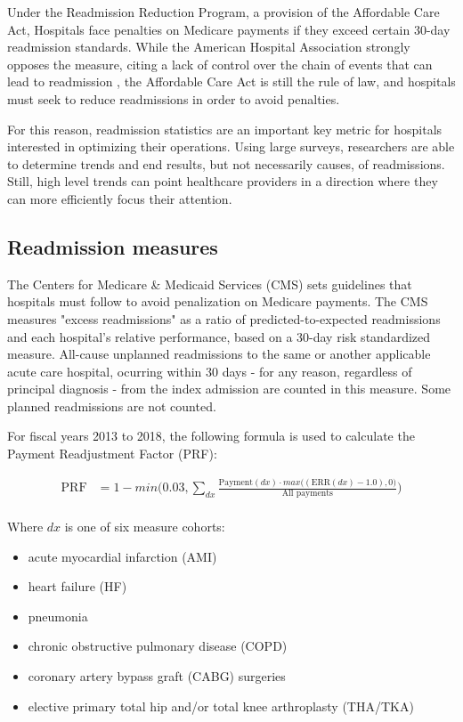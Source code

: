 Under the Readmission Reduction Program, a provision of the Affordable Care Act, 
Hospitals face penalties on Medicare payments if they exceed certain 30-day readmission standards. While the 
American Hospital Association strongly opposes the measure, citing a lack of control over the chain of events
that can lead to readmission \cite{Rice2015, AHA2018}, the Affordable Care Act is still the rule of law, and hospitals must seek
to reduce readmissions in order to avoid penalties.

For this reason, readmission statistics are an important key metric for hospitals interested in optimizing 
their operations. Using large surveys, researchers are able to determine trends and end results, but not necessarily 
causes, of readmissions. Still, high level trends can point healthcare providers in a direction where they can
more efficiently focus their attention. 

\subsection{Readmission measures}

The Centers for Medicare \& Medicaid Services (CMS) sets guidelines that hospitals must follow to avoid penalization on Medicare payments. 
The CMS measures "excess readmissions" as a ratio of predicted-to-expected readmissions and each hospital's relative performance, based on
a 30-day risk standardized measure. All-cause unplanned readmissions to the same or another applicable acute care hospital, 
ocurring within 30 days - for any reason, regardless of principal diagnosis - from the index admission are counted in this measure.
Some planned readmissions are not counted. \cite{HRRP}

For fiscal years 2013 to 2018, the following formula is used to calculate the Payment Readjustment Factor (PRF):

\begin{equation} \label{prf}
\begin{split}
  \text{PRF} &= 1 - min\bigg(0.03, \sum_{dx} \frac{\text{Payment}(dx) \cdot max\big((\text{ERR}(dx) - 1.0), 0\big)}{\text{All payments}}\bigg) \\
\end{split}
\end{equation}
 
Where $dx$ is one of six measure cohorts: 

\begin{itemize}
  \item acute myocardial infarction (AMI)
  \item heart failure (HF)
  \item pneumonia
  \item chronic obstructive pulmonary disease (COPD)
  \item coronary artery bypass graft (CABG) surgeries
  \item elective primary total hip and/or total knee arthroplasty (THA/TKA)
\end{itemize}

